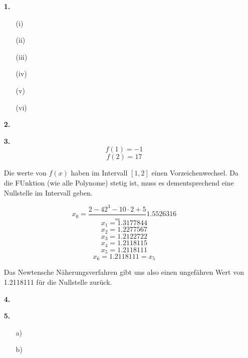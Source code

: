 \documentclass[a4paper,11pt]{scrartcl}
\author{\authorinfo}
\title{\titleinfo}
\date{\today}
\begin{document}
\maketitle
\begin{enumerate}
    \item[\textbf{1.}]
        \begin{enumerate}
            \item[(i)] 
            \item[(ii)] 
            \item[(iii)]
            \item[(iv)] 
            \item[(v)]  
            \item[(vi)] 
        \end{enumerate}

    \item[\textbf{2.}]


    \item[\textbf{3.}]
        \[ f(1) = -1 \]
        \[ f(2) = 17 \]

        Die werte von $f(x)$ haben im Intervall $[1,2]$ einen Vorzeichenwechsel. Da die FUnktion (wie alle Polynome) stetig ist,
        muss es dementsprechend eine Nullstelle im Intervall geben.

        \[ x_0 = \frac{2 - 42^3 - 10 \cdot 2 + 5} = 1.5526316\]
        \[ x_1 = 1.3177844\]
        \[ x_2 = 1.2277567\]
        \[ x_3 = 1.2122722\]
        \[ x_4 = 1.2118115\]
        \[ x_5 = 1.2118111\]
        \[ x_6 = 1.2118111 = x_5\]

        Das Newtensche Näherungsverfahren gibt uns also einen ungefähren Wert von 1.2118111 für die Nullstelle zurück.

    \newpage
    \item[\textbf{4.}]
    \item[\textbf{5.}]
        \begin{enumerate}
            \item[a)]
            \item[b)]
        \end{enumerate}
    \end{enumerate}
\end{document}
